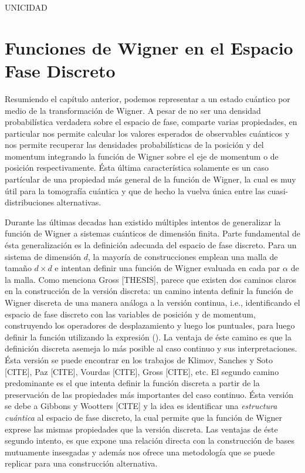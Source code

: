 \documentclass[a4paper]{report}
\begin{document}
  UNICIDAD

  \chapter{Funciones de Wigner en el Espacio Fase Discreto}

  Resumiendo el capítulo anterior, podemos representar a un
  estado cuántico por medio de la transformación de Wigner.
  A pesar de no ser una densidad probabilística verdadera
  sobre el espacio de fase, comparte varias propiedades, en
  particular nos permite calcular los valores esperados de
  observables cuánticos y nos permite recuperar las
  densidades probabilísticas de la posición y del momentum
  integrando la función de Wigner sobre el eje de momentum o
  de posición respectivamente. Ésta última característica
  solamente es un caso partícular de una propiedad más
  general de la función de Wigner, la cual es muy útil para
  la tomografía cuántica y que de hecho la vuelva única
  entre las cuasi-distribuciones alternativas.

  Durante las últimas decadas han existido múltiples
  intentos de generalizar la función de Wigner a sistemas
  cuánticos de dimensión finita. Parte fundamental de ésta
  generalización es la definición adecuada del espacio de
  fase discreto. Para un sistema de dimensión $d$, la
  mayoría de construcciones emplean una malla de tamaño $d
  \times d$ e intentan definir una función de Wigner
  evaluada en cada par $\alpha$ de la malla. Como menciona
  Gross [THESIS], parece que existen dos caminos claros en
  la construcción de la versión discreta: un camino intenta
  definir la función de Wigner discreta de una manera
  análoga a la versión continua, i.e., identificando el
  espacio de fase discreto con las variables de posición y
  de momentum, construyendo los operadores de desplazamiento
  y luego los puntuales, para luego definir la función
  utilizando la expresión (). La ventaja de éste camino es
  que la definición discreta asemeja lo más posible al caso
  continuo y sus interpretaciones.  Ésta versión se puede
  encontrar en los trabajos de Klimov, Sanches y Soto
  [CITE], Paz [CITE], Vourdas [CITE], Gross [CITE], etc. El
  segundo camino predominante es el que intenta definir la
  función discreta a partir de la preservación de las
  propiedades más importantes del caso continuo. Ésta
  versión se debe a Gibbons y Wootters [CITE] y la idea es
  identificar una \textit{estructura cuántica} al espacio de
  fase discreto, la cual permite que la función de Wigner
  exprese las mismas propiedades que la versión discreta.
  Las ventajas de éste segundo intento, es que expone una
  relación directa con la construcción de bases mutuamente
  insesgadas y además nos ofrece una metodología que se
  puede replicar para una construcción alternativa.
\end{document}
